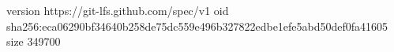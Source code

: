 version https://git-lfs.github.com/spec/v1
oid sha256:eca06290bf34640b258de75dc559e496b327822edbe1efe5abd50def0fa41605
size 349700
